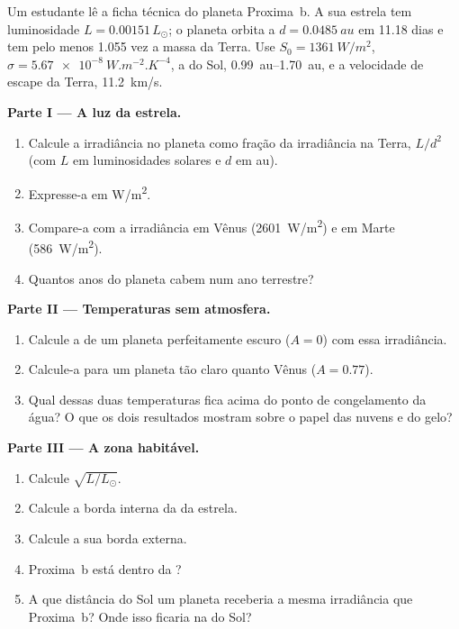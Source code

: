 \begin{problem}
\label{pb:g10:habitable-planet:1}
Um estudante lê a ficha técnica do planeta Proxima~b. A sua estrela tem
luminosidade $L = 0.00151\,L_\odot$; o planeta orbita a
$d = \qty{0.0485}{au}$ em 11.18 dias e tem pelo menos 1.055 vez a massa da
Terra. Use $S_0 = \qty{1361}{W/m^2}$, $\sigma = \qty{5.67e-8}{W.m^{-2}.K^{-4}}$,
a  do Sol, \qtyrange{0.99}{1.70}{au}, e a velocidade de
escape da Terra, \qty{11.2}{km/s}.

\medskip
\noindent\textbf{Parte I --- A luz da estrela.}
\begin{enumerate}
  \item Calcule a irradiância no planeta como fração da irradiância na
        Terra, $L/d^2$ (com $L$ em luminosidades solares e $d$ em au).
  \item Expresse-a em \unit{W/m^2}.
  \item Compare-a com a irradiância em Vênus (\qty{2601}{W/m^2}) e em
        Marte (\qty{586}{W/m^2}).
  \item Quantos anos do planeta cabem num ano terrestre?
\end{enumerate}

\medskip
\noindent\textbf{Parte II --- Temperaturas sem atmosfera.}
\begin{enumerate}[resume]
  \item Calcule a  de um planeta perfeitamente
        escuro ($A = 0$) com essa irradiância.
  \item Calcule-a para um planeta tão claro quanto Vênus ($A = 0.77$).
  \item Qual dessas duas temperaturas fica acima do ponto de congelamento
        da água? O que os dois resultados mostram sobre o papel das nuvens
        e do gelo?
\end{enumerate}

\medskip
\noindent\textbf{Parte III --- A zona habitável.}
\begin{enumerate}[resume]
  \item Calcule $\sqrt{L/L_\odot}$.
  \item Calcule a borda interna da  da estrela.
  \item Calcule a sua borda externa.
  \item Proxima~b está dentro da ?
  \item A que distância do Sol um planeta receberia a mesma irradiância que
        Proxima~b? Onde isso ficaria na  do Sol?
\end{enumerate}


\end{problem}
